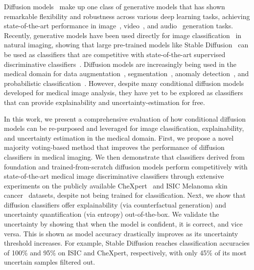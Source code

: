 Diffusion models~\cite{ho2020denoisingdiffusionprobabilisticmodels} make up one class of generative models that has shown remarkable flexibility and robustness across various deep learning tasks, achieving state-of-the-art performance in image~\cite{dhariwal2021diffusionmodelsbeatgans}, video~\cite{ho2022videodiffusionmodels}, and audio~\cite{kong2020diffwave} generation tasks. Recently, generative models have been used directly for image classification~\cite{Li:arXiv:2023:diffusionClassifier, clark2023texttoimagediffusionmodelszeroshot, Krojer:arXiv:2023:DiffusionReasoners, chen2024robustclassificationsinglediffusion} in natural imaging, showing that large pre-trained models like Stable Diffusion~\cite{rombach2022highresolutionimagesynthesislatent} can be used as classifiers that are competitive with state-of-the-art supervised discriminative classifiers~\cite{he2015deep, dosovitskiy2020image}. Diffusion models are increasingly being used in the medical domain for data augmentation~\cite{guo2024maisimedicalaisynthetic}, segmentation~\cite{wu2023medsegdiffmedicalimagesegmentation, wu2023medsegdiffv2diffusionbasedmedical}, anomaly detection~\cite{wolleb2022diffusionmodelsmedicalanomaly}, and probabilistic classification~\cite{shen2024improvingrobustnessreliabilitymedical}. However, despite many conditional diffusion models developed for medical image analysis, they have yet to be explored as classifiers that can provide explainability and uncertainty-estimation for free.

In this work, we present a comprehensive evaluation of how conditional diffusion models can be re-purposed and leveraged for image classification, explainability, and uncertainty estimation in the medical domain. First, we propose a novel majority voting-based method that improves the performance of diffusion classifiers in medical imaging. We then demonstrate that classifiers derived from foundation and trained-from-scratch diffusion models perform competitively with state-of-the-art medical image discriminative classifiers through extensive experiments on the publicly available CheXpert~\cite{irvin2019chexpert} and ISIC Melanoma skin cancer~\cite{Rotemberg2020APD} datasets, despite not being trained for classification. Next, we show that diffusion classifiers offer explainability (via counterfactual generation) and uncertainty quantification (via entropy) out-of-the-box. We validate the uncertainty by showing that when the model is confident, it is correct, and vice versa. This is shown as model accuracy drastically improves as its uncertainty threshold increases. For example, Stable Diffusion reaches classification accuracies of 100\% and 95\% on ISIC and CheXpert, respectively, with only 45\% of its most uncertain samples filtered out. %

\begin{comment}
    In doing so, we seek to demonstrate that diffusion models, can offer competitive performance in discriminative tasks, providing a new avenue for a more environmentally sustainable approach to deploying advanced deep learning solutions in medical imaging.
\end{comment}